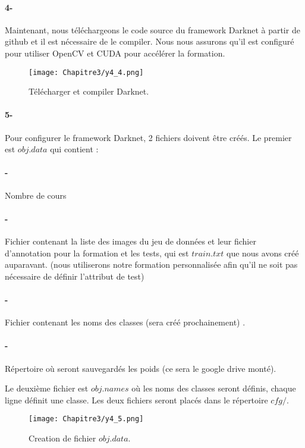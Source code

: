      \paragraph{4-} Maintenant, nous téléchargeons le code source du framework Darknet à partir de github et il est nécessaire de le compiler. Nous nous assurons qu'il est configuré pour utiliser OpenCV et CUDA pour accélérer la formation.
     \begin{figure}[H]
               \centering
               \texttt{[image: Chapitre3/y4\_4.png]}
               \caption{Télécharger et compiler Darknet.}
               \label{y4_4}
               \end{figure}

     \paragraph{5-} Pour configurer le framework Darknet, 2 fichiers doivent être créés. Le premier est \(obj.data\) qui contient :
     \paragraph{-} Nombre de cours

     \paragraph{-} Fichier contenant la liste des images du jeu de données et leur fichier d'annotation pour la formation et les tests, qui est \(train.txt\) que nous avons créé auparavant. (nous utiliserons notre formation personnalisée afin qu'il ne soit pas nécessaire de définir l'attribut de test)
     \paragraph{-} Fichier contenant les noms des classes (sera créé prochainement) .
     \paragraph{-} Répertoire où seront sauvegardés les poids (ce sera le google drive monté).
     
     Le deuxième fichier est \(obj.names\) où les noms des classes seront définis, chaque ligne définit une classe.
     Les deux fichiers seront placés dans le répertoire \(cfg/\).
     \begin{figure}[H]
               \centering
               \texttt{[image: Chapitre3/y4\_5.png]}
               \caption{Creation de fichier \(obj.data\).}
               \label{y4_5}
               \end{figure}
               
